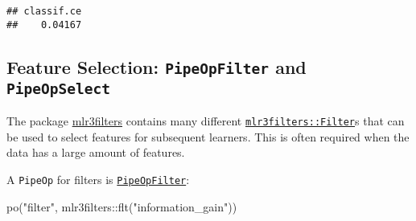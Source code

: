\documentclass[
]{scrbook}
\newenvironment{Shaded}{\begin{snugshade}}{\end{snugshade}}
\newcommand{\DecValTok}[1]{\textcolor[rgb]{0.00,0.00,0.81}{#1}}
\newcommand{\FunctionTok}[1]{\textcolor[rgb]{0.00,0.00,0.00}{#1}}
\newcommand{\NormalTok}[1]{#1}
\newcommand{\OtherTok}[1]{\textcolor[rgb]{0.56,0.35,0.01}{#1}}
\newcommand{\SpecialCharTok}[1]{\textcolor[rgb]{0.00,0.00,0.00}{#1}}
\newcommand{\StringTok}[1]{\textcolor[rgb]{0.31,0.60,0.02}{#1}}
\renewenvironment{Shaded} {\begin{snugshade}\small} {\end{snugshade}}
\begin{document}
\begin{Shaded}
\end{Shaded}

\begin{verbatim}
## classif.ce 
##    0.04167
\end{verbatim}

\hypertarget{feature-selection-pipeopfilter-and-pipeopselect}{%
\subsection{\texorpdfstring{Feature Selection: \texttt{PipeOpFilter} and \texttt{PipeOpSelect}}{Feature Selection: PipeOpFilter and PipeOpSelect}}\label{feature-selection-pipeopfilter-and-pipeopselect}}

The package \href{https://mlr3filters.mlr-org.com}{mlr3filters} contains many different \href{https://mlr3filters.mlr-org.com/reference/Filter.html}{\texttt{mlr3filters::Filter}}s that can be used to select features for subsequent learners.
This is often required when the data has a large amount of features.

A \texttt{PipeOp} for filters is \href{https://mlr3pipelines.mlr-org.com/reference/mlr_pipeops_filter.html}{\texttt{PipeOpFilter}}:

\begin{Shaded}
\begin{Highlighting}[]
\FunctionTok{po}\NormalTok{(}\StringTok{"filter"}\NormalTok{, mlr3filters}\SpecialCharTok{::}\FunctionTok{flt}\NormalTok{(}\StringTok{"information\_gain"}\NormalTok{))}
\end{Highlighting}
\end{Shaded}
\end{document}
